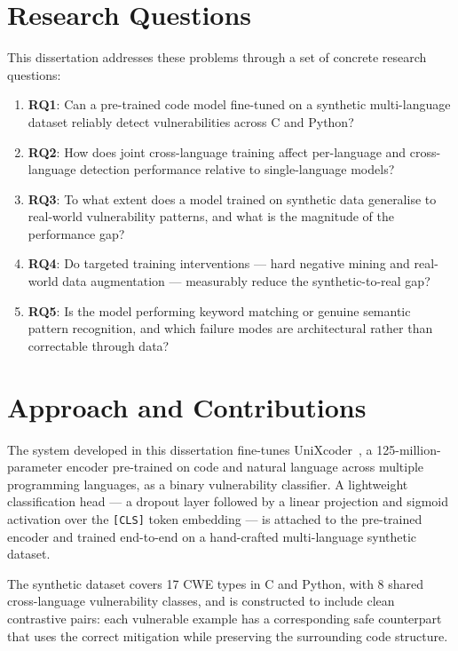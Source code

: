 \section{Research Questions}

This dissertation addresses these problems through a set of concrete research questions:

\begin{enumerate}
  \item \textbf{RQ1}: Can a pre-trained code model fine-tuned on a synthetic multi-language
        dataset reliably detect vulnerabilities across C and Python?
  \item \textbf{RQ2}: How does joint cross-language training affect per-language and
        cross-language detection performance relative to single-language models?
  \item \textbf{RQ3}: To what extent does a model trained on synthetic data generalise
        to real-world vulnerability patterns, and what is the magnitude of the performance gap?
  \item \textbf{RQ4}: Do targeted training interventions --- hard negative mining and
        real-world data augmentation --- measurably reduce the synthetic-to-real gap?
  \item \textbf{RQ5}: Is the model performing keyword matching or genuine semantic
        pattern recognition, and which failure modes are architectural rather than correctable
        through data?
\end{enumerate}

\section{Approach and Contributions}

The system developed in this dissertation fine-tunes UniXcoder~\cite{guo2022unixcoder},
a 125-million-parameter encoder pre-trained on code and natural language across multiple
programming languages, as a binary vulnerability classifier.
A lightweight classification head --- a dropout layer followed by a linear projection
and sigmoid activation over the \texttt{[CLS]} token embedding --- is attached to
the pre-trained encoder and trained end-to-end on a hand-crafted multi-language
synthetic dataset.

The synthetic dataset covers 17 CWE types in C and Python, with 8 shared cross-language
vulnerability classes, and is constructed to include clean contrastive pairs:
each vulnerable example has a corresponding safe counterpart that uses the correct
mitigation while preserving the surrounding code structure.

